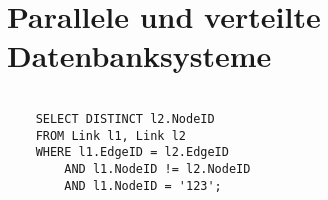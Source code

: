 \section{Parallele und verteilte Datenbanksysteme}
\label{sec-3}


\begin{lstlisting}[caption={DUMMY TEXT.},captionpos=b,label={src:neighbourhood}]

	SELECT DISTINCT l2.NodeID 
	FROM Link l1, Link l2 
	WHERE l1.EdgeID = l2.EdgeID 
		AND l1.NodeID != l2.NodeID
		AND l1.NodeID = '123';
\end{lstlisting}		